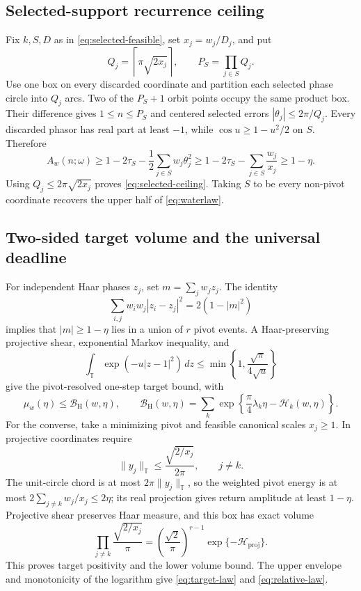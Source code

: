 \documentclass[10pt]{article}
\theoremstyle{definition}
\newcommand{\T}{\mathbb T}
\newcommand{\proj}{\mathrm{proj}}
\newcommand{\Hwater}{\mathcal H}
\newcommand{\Bhaar}{\mathcal B_{\mathrm H}}
\begin{document}
\subsection*{Selected-support recurrence ceiling}

Fix \(k,S,D\) as in \eqref{eq:selected-feasible}, set
\(x_j=w_j/D_j\), and put
\[
 Q_j=\left\lceil\pi\sqrt{2x_j}\right\rceil,\qquad
 P_S=\prod_{j\in S}Q_j.
\]
Use one box on every discarded coordinate and partition each selected phase
circle into \(Q_j\) arcs.  Two of the \(P_S+1\) orbit points occupy the same
product box.  Their difference gives \(1\leq n\leq P_S\) and centered
selected errors \(|\theta_j|\leq2\pi/Q_j\).  Every discarded phasor has real
part at least \(-1\), while \(\cos u\geq1-u^2/2\) on \(S\).  Therefore
\[
 A_w(n;\omega)\geq1-2\tau_S-\frac12\sum_{j\in S}w_j\theta_j^2
 \geq1-2\tau_S-\sum_{j\in S}\frac{w_j}{x_j}\geq1-\eta.
\]
Using \(Q_j\leq2\pi\sqrt{2x_j}\) proves
\eqref{eq:selected-ceiling}.  Taking \(S\) to be every non-pivot coordinate
recovers the upper half of \eqref{eq:waterlaw}.

\subsection*{Two-sided target volume and the universal deadline}

For independent Haar phases \(z_j\), set \(m=\sum_jw_jz_j\).  The identity
\[
 \sum_{i,j}w_iw_j|z_i-z_j|^2=2(1-|m|^2)
\]
implies that \(|m|\geq1-\eta\) lies in a union of \(r\) pivot events.  A
Haar-preserving projective shear, exponential Markov inequality, and
\[
 \int_{\T}\exp(-u|z-1|^2)\,dz
 \leq\min\!\left\{1,\frac{\sqrt\pi}{4\sqrt u}\right\}
\]
give the pivot-resolved one-step target bound, with
\[
 \mu_w(\eta)\leq\Bhaar(w,\eta),\qquad
 \Bhaar(w,\eta)=
 \sum_k\exp\!\left\{\frac{\pi}{4}\lambda_k\eta
 -\Hwater_k(w,\eta)\right\}.
\]
For the converse, take a minimizing pivot and feasible canonical scales
\(x_j\geq1\).  In projective coordinates require
\[
 \|y_j\|_{\T}\leq\frac{\sqrt{2/x_j}}{2\pi},\qquad j\ne k.
\]
The unit-circle chord is at most \(2\pi\|y_j\|_{\T}\), so the weighted pivot
energy is at most \(2\sum_{j\ne k}w_j/x_j\leq2\eta\); its real projection
gives return amplitude at least \(1-\eta\).  Projective shear preserves Haar
measure, and this box has exact volume
\[
 \prod_{j\ne k}\frac{\sqrt{2/x_j}}{\pi}
 =\left(\frac{\sqrt2}{\pi}\right)^{r-1}
   \exp\{-\Hwater_{\proj}\}.
\]
This proves target positivity and the lower volume bound.  The upper envelope
and monotonicity of the logarithm give \eqref{eq:target-law} and
\eqref{eq:relative-law}.
\end{document}
